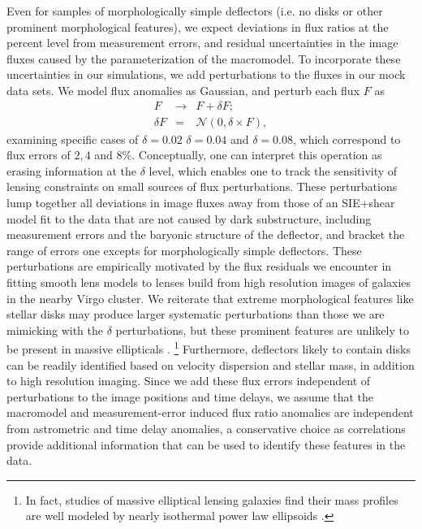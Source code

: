 Even for samples of morphologically simple deflectors (i.e. no disks or other prominent morphological features), we expect deviations in flux ratios at the percent level from measurement errors, and residual uncertainties in the image fluxes caused by the parameterization of the macromodel. To incorporate these uncertainties in our simulations, we add perturbations to the fluxes in our mock data sets. We model flux anomalies as Gaussian, and perturb each flux $F$ as
\begin{eqnarray}
\label{eqn:newfr}
F & \rightarrow & F + \delta F; \\ \delta F & = & \nonumber \mathcal{N} \left(0,\delta \times F\right),
\end{eqnarray}
examining specific cases of $\delta = 0.02$ $\delta = 0.04$ and $\delta = 0.08$, which correspond to flux errors of $2,4$ and $8\%$. Conceptually, one can interpret this operation as erasing information at the $\delta$ level, which enables one to track the sensitivity of lensing constraints on small sources of flux perturbations. These perturbations lump together all deviations in image fluxes away from those of an SIE+shear model fit to the data that are not caused by dark substructure, including measurement errors and the baryonic structure of the deflector, and bracket the range of errors one excepts for morphologically simple deflectors. These perturbations are empirically motivated by the flux residuals we encounter in \cite{Gilman++17} fitting smooth lens models to lenses build from high resolution images of galaxies in the nearby Virgo cluster. We reiterate that extreme morphological features like stellar disks may produce larger systematic perturbations than those we are mimicking with the $\delta$ perturbations, but these prominent features are unlikely to be present in massive ellipticals \cite{Auger++10,Son++13a}. \footnote{In fact, studies of massive elliptical lensing galaxies find their mass profiles are well modeled by nearly isothermal power law ellipsoids \cite{Shankar++17,Gilman++17}.} Furthermore, deflectors likely to contain disks can be readily identified based on velocity dispersion and stellar mass, in addition to high resolution imaging. Since we add these flux errors independent of perturbations to the image positions and time delays, we assume that the macromodel and measurement-error induced flux ratio anomalies are independent from astrometric and time delay anomalies, a conservative choice as correlations provide additional information that can be used to identify these features in the data.

